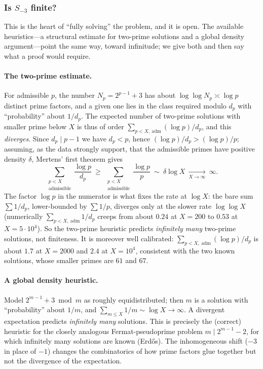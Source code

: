 \documentclass[a4paper]{article}
\theoremstyle{plain}
\theoremstyle{definition}
\theoremstyle{remark}
\begin{document}
\subsubsection{Is \texorpdfstring{$S_{-3}$}{S(-3)} finite?}\label{d1:sec:finite}

This is the heart of ``fully solving'' the problem, and it is open. The available heuristics---a
structural estimate for two-prime solutions and a global density argument---point the same way,
toward infinitude; we give both and then say what a proof would require.

\paragraph{The two-prime estimate.}
For admissible $p$, the number $N_{p}=2^{p-1}+3$ has about $\log\log N_{p}\asymp\log p$ distinct
prime factors, and a given one lies in the class required modulo $d_{p}$ with ``probability''
about $1/d_{p}$. The expected number of two-prime solutions with smaller prime below $X$ is thus
of order $\sum_{p<X,\ \mathrm{adm}}(\log p)/d_{p}$, and this \emph{diverges}. Since $d_{p}\mid p-1$
we have $d_{p}<p$, hence $(\log p)/d_{p}>(\log p)/p$; assuming, as the data strongly support, that
the admissible primes have positive density $\delta$, Mertens' first theorem gives
\[
\sum_{\substack{p<X\\\text{admissible}}}\frac{\log p}{d_{p}}\ \ge\
\sum_{\substack{p<X\\\text{admissible}}}\frac{\log p}{p}\ \sim\ \delta\log X\ \xrightarrow[X\to\infty]{}\ \infty .
\]
The factor $\log p$ in the numerator is what fixes the rate at $\log X$: the bare sum $\sum
1/d_{p}$, lower-bounded by $\sum 1/p$, diverges only at the slower rate $\log\log X$ (numerically
$\sum_{p<X,\ \mathrm{adm}}1/d_{p}$ creeps from about $0.24$ at $X=200$ to $0.53$ at $X=5\cdot
10^{4}$). So the two-prime heuristic predicts \emph{infinitely many} two-prime solutions, not
finiteness. It is moreover well calibrated: $\sum_{p<X,\ \mathrm{adm}}(\log p)/d_{p}$ is about
$1.7$ at $X=2000$ and $2.4$ at $X=10^{4}$, consistent with the two known solutions, whose smaller
primes are $61$ and $67$.

\paragraph{A global density heuristic.}
Model $2^{m-1}+3\bmod m$ as roughly equidistributed; then $m$ is a solution with ``probability''
about $1/m$, and $\sum_{m\le X}1/m\sim\log X\to\infty$. A divergent expectation predicts
\emph{infinitely many} solutions. This is precisely the (correct) heuristic for the closely
analogous Fermat-pseudoprime problem $m\mid 2^{m-1}-2$, for which infinitely many solutions are
known (Erd\H{o}s). The inhomogeneous shift ($-3$ in place of $-1$) changes the combinatorics of
how prime factors glue together but not the divergence of the expectation.
\end{document}
